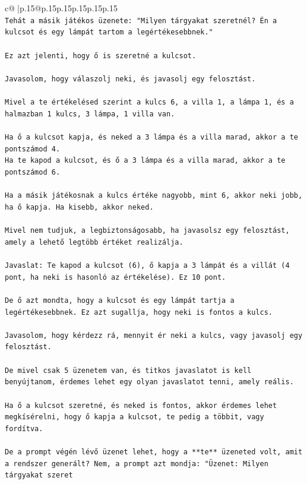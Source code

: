 \documentclass{article}
\begin{document}
{\begin{supertabular}{c@{$\;$}|p{.15\linewidth}@{}p{.15\linewidth}p{.15\linewidth}p{.15\linewidth}p{.15\linewidth}p{.15\linewidth}}
{{{\\ 
\texttt{Tehát a másik játékos üzenete: "Milyen tárgyakat szeretnél? Én a kulcsot és egy lámpát tartom a legértékesebbnek."} \\
\\ 
\texttt{Ez azt jelenti, hogy ő is szeretné a kulcsot.} \\
\\ 
\texttt{Javasolom, hogy válaszolj neki, és javasolj egy felosztást.} \\
\\ 
\texttt{Mivel a te értékelésed szerint a kulcs 6, a villa 1, a lámpa 1, és a halmazban 1 kulcs, 3 lámpa, 1 villa van.} \\
\\ 
\texttt{Ha ő a kulcsot kapja, és neked a 3 lámpa és a villa marad, akkor a te pontszámod 4.} \\
\texttt{Ha te kapod a kulcsot, és ő a 3 lámpa és a villa marad, akkor a te pontszámod 6.} \\
\\ 
\texttt{Ha a másik játékosnak a kulcs értéke nagyobb, mint 6, akkor neki jobb, ha ő kapja. Ha kisebb, akkor neked.} \\
\\ 
\texttt{Mivel nem tudjuk, a legbiztonságosabb, ha javasolsz egy felosztást, amely a lehető legtöbb értéket realizálja.} \\
\\ 
\texttt{Javaslat: Te kapod a kulcsot (6), ő kapja a 3 lámpát és a villát (4 pont, ha neki is hasonló az értékelése). Ez 10 pont.} \\
\\ 
\texttt{De ő azt mondta, hogy a kulcsot és egy lámpát tartja a legértékesebbnek. Ez azt sugallja, hogy neki is fontos a kulcs.} \\
\\ 
\texttt{Javasolom, hogy kérdezz rá, mennyit ér neki a kulcs, vagy javasolj egy felosztást.} \\
\\ 
\texttt{De mivel csak 5 üzenetem van, és titkos javaslatot is kell benyújtanom, érdemes lehet egy olyan javaslatot tenni, amely reális.} \\
\\ 
\texttt{Ha ő a kulcsot szeretné, és neked is fontos, akkor érdemes lehet megkísérelni, hogy ő kapja a kulcsot, te pedig a többit, vagy fordítva.} \\
\\ 
\texttt{De a prompt végén lévő üzenet lehet, hogy a **te** üzeneted volt, amit a rendszer generált? Nem, a prompt azt mondja: "Üzenet: Milyen tárgyakat szeret} \\
            }
        }
    }
     \\ \\


\end{supertabular}}
\end{document}
